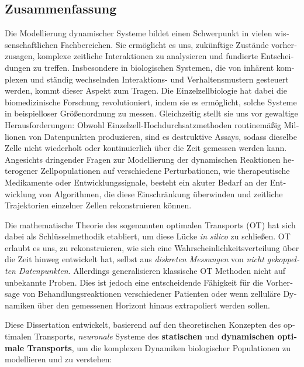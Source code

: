 \begin{otherlanguage}{ngerman}
\chapter*{Zusammenfassung}

Die Modellierung dynamischer Systeme bildet einen Schwerpunkt in vielen wissenschaftlichen Fachbereichen. Sie erm{\"o}glicht es uns, zuk{\"u}nftige Zust{\"a}nde vorherzusagen, komplexe zeitliche Interaktionen zu analysieren und fundierte Entscheidungen zu treffen. Insbesondere in biologischen Systemen, die von inh{\"a}rent komplexen und st{\"a}ndig wechselnden Interaktions- und Verhaltensmustern gesteuert werden, kommt dieser Aspekt zum Tragen.
Die Einzelzellbiologie hat dabei die biomedizinische Forschung revolutioniert, indem sie es erm{\"o}glicht, solche Systeme in beispielloser Gr{\"o}{\ss}enordnung zu messen. Gleichzeitig stellt sie uns vor gewaltige Herausforderungen: Obwohl Einzelzell-Hochdurchsatzmethoden routinem{\"a}{\ss}ig Millionen von Datenpunkten produzieren, sind es destruktive Assays, sodass dieselbe Zelle nicht wiederholt oder kontinuierlich {\"u}ber die Zeit gemessen werden kann.
Angesichts dringender Fragen zur Modellierung der dynamischen Reaktionen heterogener Zellpopulationen auf verschiedene Perturbationen, wie therapeutische Medikamente oder Entwicklungssignale, besteht ein akuter Bedarf an der Entwicklung von Algorithmen, die diese Einschr{\"a}nkung {\"u}berwinden und zeitliche Trajektorien einzelner Zellen rekonstruieren k{\"o}nnen.

Die mathematische Theorie des sogenannten optimalen Transports (OT) hat sich dabei als Schl{\"u}sselmethodik etabliert, um diese L{\"u}cke \emph{in silico} zu schlie{\ss}en. OT erlaubt es uns, zu rekonstruieren, wie sich eine Wahrscheinlichkeitsverteilung {\"u}ber die Zeit hinweg entwickelt hat, selbst aus \textit{diskreten Messungen} von \textit{nicht gekoppelten Datenpunkten}. Allerdings generalisieren klassische OT Methoden nicht auf unbekannte Proben. Dies ist jedoch eine entscheidende F{\"a}higkeit f{\"u}r die Vorhersage von Behandlungsreaktionen verschiedener Patienten oder wenn zellul{\"a}re Dynamiken {\"u}ber den gemessenen Horizont hinaus extrapoliert werden sollen.

Diese Dissertation entwickelt, basierend auf den theoretischen Konzepten des optimalen Transports, \textit{neuronale} Systeme des \textbf{statischen} und \textbf{dynamischen optimale Transports}, um die komplexen Dynamiken biologischer Populationen zu modellieren und zu verstehen:


\end{otherlanguage}
